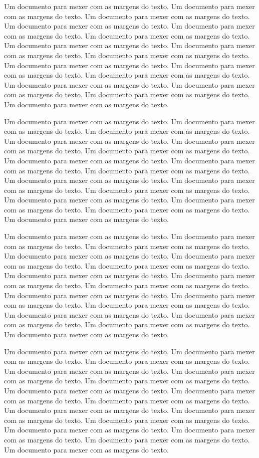\documentclass[12pt,article,a4paper,oneside]{memoir}
\begin{document}
Um documento para mexer com as margens do texto. Um documento para mexer com as margens do texto. Um documento para mexer com as margens do texto. Um documento para mexer com as margens do texto. Um documento para mexer com as margens do texto. Um documento para mexer com as margens do texto. Um documento para mexer com as margens do texto. Um documento para mexer com as margens do texto. Um documento para mexer com as margens do texto. Um documento para mexer com as margens do texto. Um documento para mexer com as margens do texto. Um documento para mexer com as margens do texto. Um documento para mexer com as margens do texto. Um documento para mexer com as margens do texto. Um documento para mexer com as margens do texto. Um documento para mexer com as margens do texto. 

Um documento para mexer com as margens do texto. Um documento para mexer com as margens do texto. Um documento para mexer com as margens do texto. Um documento para mexer com as margens do texto. Um documento para mexer com as margens do texto. Um documento para mexer com as margens do texto. Um documento para mexer com as margens do texto. Um documento para mexer com as margens do texto. Um documento para mexer com as margens do texto. Um documento para mexer com as margens do texto. Um documento para mexer com as margens do texto. Um documento para mexer com as margens do texto. Um documento para mexer com as margens do texto. Um documento para mexer com as margens do texto. Um documento para mexer com as margens do texto. Um documento para mexer com as margens do texto. 

Um documento para mexer com as margens do texto. Um documento para mexer com as margens do texto. Um documento para mexer com as margens do texto. Um documento para mexer com as margens do texto. Um documento para mexer com as margens do texto. Um documento para mexer com as margens do texto. Um documento para mexer com as margens do texto. Um documento para mexer com as margens do texto. Um documento para mexer com as margens do texto. Um documento para mexer com as margens do texto. Um documento para mexer com as margens do texto. Um documento para mexer com as margens do texto. Um documento para mexer com as margens do texto. Um documento para mexer com as margens do texto. Um documento para mexer com as margens do texto. Um documento para mexer com as margens do texto. 

Um documento para mexer com as margens do texto. Um documento para mexer com as margens do texto. Um documento para mexer com as margens do texto. Um documento para mexer com as margens do texto. Um documento para mexer com as margens do texto. Um documento para mexer com as margens do texto. Um documento para mexer com as margens do texto. Um documento para mexer com as margens do texto. Um documento para mexer com as margens do texto. Um documento para mexer com as margens do texto. Um documento para mexer com as margens do texto. Um documento para mexer com as margens do texto. Um documento para mexer com as margens do texto. Um documento para mexer com as margens do texto. Um documento para mexer com as margens do texto. Um documento para mexer com as margens do texto. 
\end{document}
